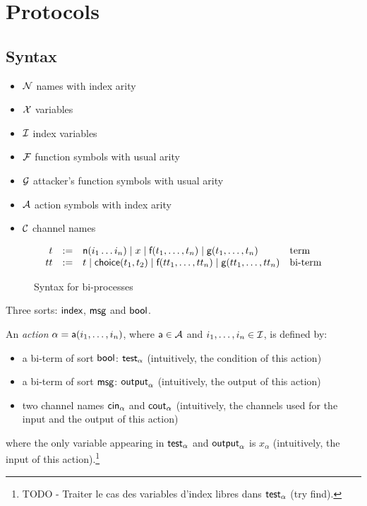 \section{Protocols}

\subsection{Syntax}

\begin{itemize}
  \item $\mathcal{N}$ names with index arity
  \item $\mathcal{X}$ variables
  \item $\mathcal{I}$ index variables
  \item $\mathcal{F}$ function symbols with usual arity
  \item $\mathcal{G}$ attacker's function symbols with usual arity
  \item $\mathcal{A}$ action symbols with index arity
  \item $\mathcal{C}$ channel names
\end{itemize}

\begin{figure}[h]
  \[
    \begin{array}{rcll}
      t & := & \textsf{n}(i_1 \dots i_n) \mid x \mid \textsf{f}(t_1,\dots,t_n) \mid \textsf{g}(t_1,\dots,t_n) & \text{term}
      \\
      tt & := & t \mid \mathsf{choice}(t_1,t_2) \mid \textsf{f}(tt_1,\dots,tt_n) \mid \textsf{g}(tt_1,\dots,tt_n) & \text{bi-term}
    \end{array}
  \]
  \caption{Syntax for bi-processes}
  \label{fig:syntax-bi-process}
\end{figure}

Three sorts: $\textsf{index}$, $\textsf{msg}$ and $\textsf{bool}$.


\begin{definition}
An \emph{action} $\alpha = \textsf{a}(i_1,\dots,i_n)$, where $\textsf{a} \in \mathcal{A}$ and $i_1,\dots,i_n \in \mathcal{I}$, is defined by:
\begin{itemize}
  \item a bi-term of sort $\textsf{bool}$: $\textsf{test}_{\alpha}$ (intuitively, the condition of this action)
  \item a bi-term of sort $\textsf{msg}$: $\textsf{output}_{\alpha}$ (intuitively, the output of this action)
  \item two channel names $\mathsf{cin}_\alpha$ and $\mathsf{cout}_\alpha$ (intuitively, the channels used for the input and the output of this action)
\end{itemize}
where the only variable appearing in $\textsf{test}_{\alpha}$ and $\textsf{output}_{\alpha}$ is $x_{\alpha}$ (intuitively, the input of this action).\footnote{TODO - Traiter le cas des variables d'index libres dans $\textsf{test}_{\alpha}$ (try find).}
\end{definition}

